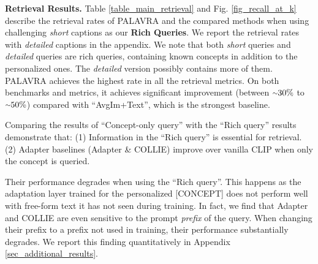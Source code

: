\documentclass[runningheads]{llncs}
\newcommand{\tildeapprox}{{\raise.17ex\hbox{$\scriptstyle\sim$}}}
\newcommand{\figref}[1]{Fig. \ref{#1}}
\newcommand{\concept}{[CONCEPT]}
\begin{document}
\noindent\textbf{Retrieval Results.}
Table \ref{table_main_retrieval} and \figref{fig_recall_at_k} describe the retrieval rates of PALAVRA and the compared methods when using challenging \textit{short} captions as our \textbf{Rich Queries}. We report the retrieval rates with \textit{detailed} captions in the appendix. We note that both \textit{short} queries and \textit{detailed} queries are rich queries, containing known concepts in addition
to the personalized ones. The \textit{detailed} version possibly contains more of them. PALAVRA achieves  the highest rate in all the  retrieval metrics. On both benchmarks and metrics, it achieves significant improvement (between $\tildeapprox30\%$ to $\tildeapprox50\%$) compared with ``AvgIm+Text'', which is the strongest baseline.

Comparing the results of ``Concept-only query'' with the ``Rich query'' results  demonstrate that: (1) Information in the ``Rich query'' is essential for retrieval.   (2) Adapter baselines (Adapter \& COLLIE) improve over vanilla CLIP when only the concept is queried.

 Their performance degrades when using the ``Rich query''. This happens as the adaptation layer trained for the personalized \concept{} does not perform well with free-form text it has not seen during training. In fact, we find that Adapter and COLLIE are even sensitive to the prompt \textit{prefix} of the query. When changing their prefix to a prefix not used in training, their performance substantially degrades. We report this finding quantitatively in Appendix \ref{sec_additional_results}.
\end{document}
